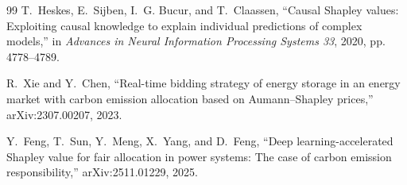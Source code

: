 \documentclass[journal, a4paper]{IEEEtran}
\begin{document}
\begin{thebibliography}{99}
T.~Heskes, E.~Sijben, I.~G. Bucur, and T.~Claassen, ``Causal Shapley values: Exploiting causal knowledge to explain individual predictions of complex models,'' in \emph{Advances in Neural Information Processing Systems 33}, 2020, pp. 4778--4789.

R.~Xie and Y.~Chen, ``Real-time bidding strategy of energy storage in an energy market with carbon emission allocation based on Aumann--Shapley prices,'' arXiv:2307.00207, 2023.

Y.~Feng, T.~Sun, Y.~Meng, X.~Yang, and D.~Feng, ``Deep learning-accelerated Shapley value for fair allocation in power systems: The case of carbon emission responsibility,'' arXiv:2511.01229, 2025.

\end{thebibliography}
\end{document}
